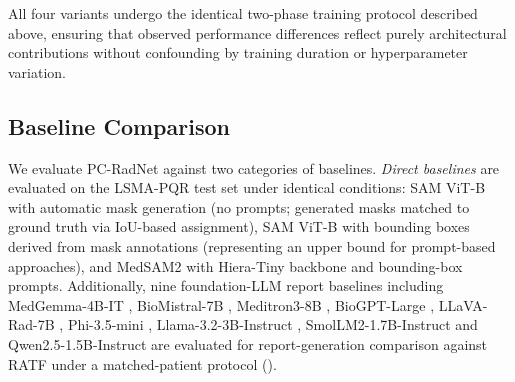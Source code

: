 \documentclass[journal]{IEEEtran}
\newcommand{\modelname}{PC-RadNet}
\begin{document}
All four variants undergo the identical two-phase training protocol described above, ensuring that observed performance differences reflect purely architectural contributions without confounding by training duration or hyperparameter variation. 

\subsection{Baseline Comparison}
We evaluate \modelname{} against two categories of baselines.
\emph{Direct baselines} are evaluated on the LSMA-PQR test set under identical conditions: SAM ViT-B with automatic mask generation \cite{kirillov2023segment} (no prompts; generated masks matched to ground truth via IoU-based assignment), SAM ViT-B with bounding boxes derived from mask annotations (representing an upper bound for prompt-based approaches), and MedSAM2 \cite{medsam2_2024} with Hiera-Tiny backbone and bounding-box prompts.
Additionally, nine foundation-LLM report baselines including MedGemma-4B-IT \cite{medgemma2025}, BioMistral-7B \cite{biomistral2024}, Meditron3-8B \cite{sallinen2025llama3meditron}, BioGPT-Large \cite{luo2022biogpt}, LLaVA-Rad-7B \cite{zambranochaves2025llavarad}, Phi-3.5-mini \cite{phi35mini2024}, Llama-3.2-3B-Instruct \cite{llama32_2024}, SmolLM2-1.7B-Instruct \cite{smollm2_2024} and Qwen2.5-1.5B-Instruct \cite{qwen25_2024} are evaluated for report-generation comparison against RATF under a matched-patient protocol ().
\end{document}
